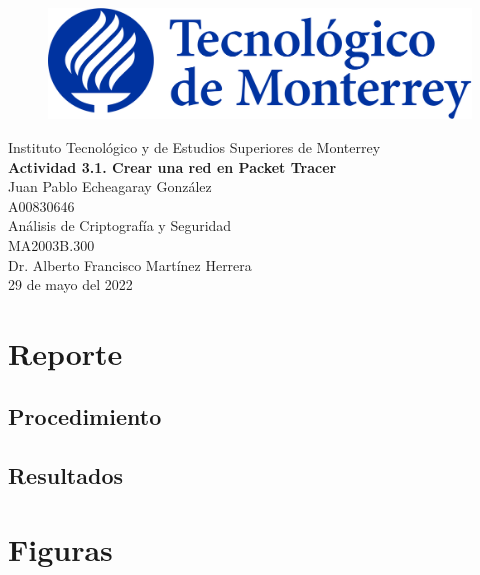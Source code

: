 \documentclass{article}
\begin{document}
    \begin{titlepage}
        \begin{center}
            \begin{figure}
                \centering
                \includegraphics[scale=0.13]{../../../logo_itesm.png}\\ %
            \end{figure}
        \vspace{5cm}
        \LARGE{Instituto Tecnológico y de Estudios Superiores de Monterrey}\\
        \fontsize{12}{14}\selectfont
        \vspace{1cm}
        \textbf{Actividad 3.1. Crear una red en Packet Tracer}\\ %
        \vspace{0.7cm}
        Juan Pablo Echeagaray González\\ %
        \vspace{0.2cm}
        A00830646\\ %
        \vspace{0.7cm}
        Análisis de Criptografía y Seguridad\\ %
        \vspace{0.2cm}
        MA2003B.300\\ %
        \vspace{0.2cm}
        Dr. Alberto Francisco Martínez Herrera\\ %
        \vspace{0.7cm}
        29 de mayo del 2022\\ %
        \end{center}
    \end{titlepage}

    \tableofcontents

    \section{Reporte}

        \subsection{Procedimiento}

            

        \subsection{Resultados}

    \appendix

    \section{Figuras}
\end{document}
